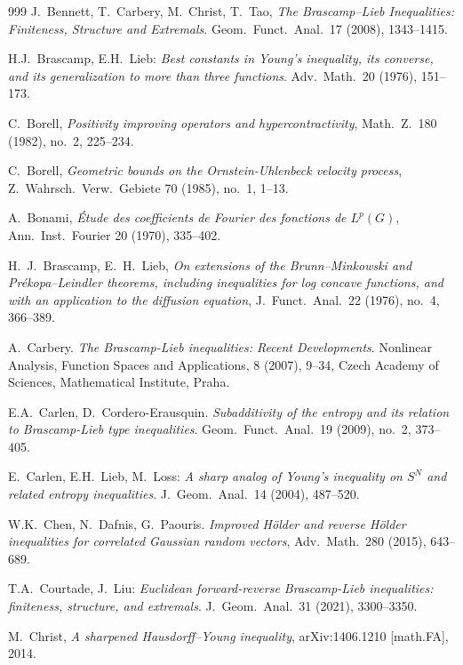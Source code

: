 \documentclass[9pt, a4paper]{amsart}
\newcommand{\1}{{\chi_{}}}%
\numberwithin{equation}{section}
\begin{document}
\begin{thebibliography}{999}
{\sc J.~Bennett, T.~Carbery, M.~Christ, T.~Tao}, 
{\em The Brascamp–Lieb Inequalities: Finiteness, Structure and Extremals}. 
Geom.\ Funct.\ Anal.\ 17 (2008), 1343--1415.

{\sc H.J.~Brascamp, E.H.~Lieb}: 
{\em Best constants in Young’s inequality, its converse, and its generalization to more than three functions}. 
Adv.\ Math.\ 20 (1976), 151--173.

{\sc C.~Borell}, 
{\em Positivity improving operators and hypercontractivity}, 
Math.\ Z.\ 180 (1982), no.~2, 225--234.

{\sc C.~Borell}, 
{\em Geometric bounds on the Ornstein-Uhlenbeck velocity process}, 
Z.\ Wahrsch.\ Verw.\ Gebiete 70 (1985), no.~1, 1--13.

{\sc A.~Bonami}, 
{\em Étude des coefficients de Fourier des fonctions de $L^p(G)$},  
Ann.\ Inst.\ Fourier 20 (1970), 335--402.

{\sc H.~J.~Brascamp, E.~H.~Lieb}, 
{\em On extensions of the Brunn--Minkowski and Prékopa--Leindler theorems, including inequalities for log concave functions, and with an application to the diffusion equation}, 
J.\ Funct.\ Anal.\ 22 (1976), no.~4, 366--389.

{\sc A.~Carbery}. 
{\em The Brascamp-Lieb inequalities: Recent Developments}. 
Nonlinear Analysis, Function Spaces and Applications, 8 (2007), 9--34, Czech Academy of Sciences, Mathematical Institute, Praha.

{\sc E.A.~Carlen, D.~Cordero-Erausquin}.  
{\em Subadditivity of the entropy and its relation to Brascamp-Lieb type inequalities}. 
Geom.\ Funct.\ Anal.\ 19 (2009), no.~2, 373--405.

{\sc E.~Carlen, E.H.~Lieb, M.~Loss}: 
{\em A sharp analog of Young’s inequality on $S^N$ and related entropy inequalities}. 
J.\ Geom.\ Anal.\ 14 (2004), 487--520.

{\sc W.K.~Chen, N.~Dafnis, G.~Paouris}. 
{\em Improved H\"older and reverse H\"older inequalities for correlated Gaussian random vectors}, 
Adv.\ Math.\ 280 (2015), 643--689.

{\sc T.A.~Courtade, J.~Liu}: 
{\em Euclidean forward-reverse Brascamp-Lieb inequalities: finiteness, structure, and extremals}. 
J.\ Geom.\ Anal.\ 31 (2021), 3300--3350.

{\sc M.~Christ}, 
{\em A sharpened Hausdorff–Young inequality}, 
arXiv:1406.1210 [math.FA], 2014.


\end{thebibliography}
\end{document}
